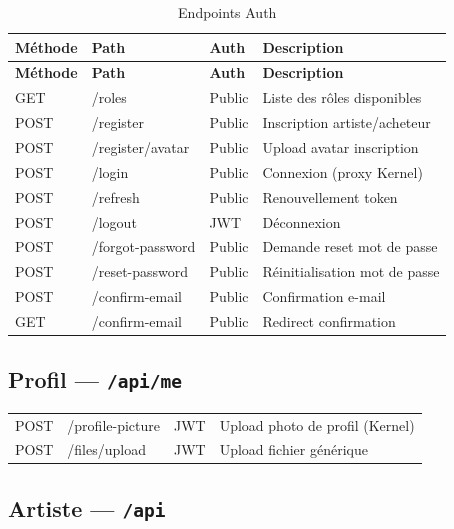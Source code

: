 \begin{longtable}{@{}llll@{}}
  \caption{Endpoints Auth} \label{tab:api-auth} \\
  \toprule
  \textbf{Méthode} & \textbf{Path} & \textbf{Auth} & \textbf{Description} \\
  \midrule
  \endfirsthead
  \toprule
  \textbf{Méthode} & \textbf{Path} & \textbf{Auth} & \textbf{Description} \\
  \midrule
  \endhead
  GET    & /roles              & Public & Liste des rôles disponibles \\
  POST   & /register           & Public & Inscription artiste/acheteur \\
  POST   & /register/avatar    & Public & Upload avatar inscription \\
  POST   & /login              & Public & Connexion (proxy Kernel) \\
  POST   & /refresh            & Public & Renouvellement token \\
  POST   & /logout             & JWT    & Déconnexion \\
  POST   & /forgot-password    & Public & Demande reset mot de passe \\
  POST   & /reset-password     & Public & Réinitialisation mot de passe \\
  POST   & /confirm-email      & Public & Confirmation e-mail \\
  GET    & /confirm-email      & Public & Redirect confirmation \\
  \bottomrule
\end{longtable}

\subsection{Profil — \texttt{/api/me}}

\begin{table}[h]
  \centering
  \small
  \begin{tabular}{@{}llll@{}}
    \toprule
    POST & /profile-picture & JWT & Upload photo de profil (Kernel) \\
    POST & /files/upload    & JWT & Upload fichier générique \\
    \bottomrule
  \end{tabular}
\end{table}

\subsection{Artiste — \texttt{/api}}


